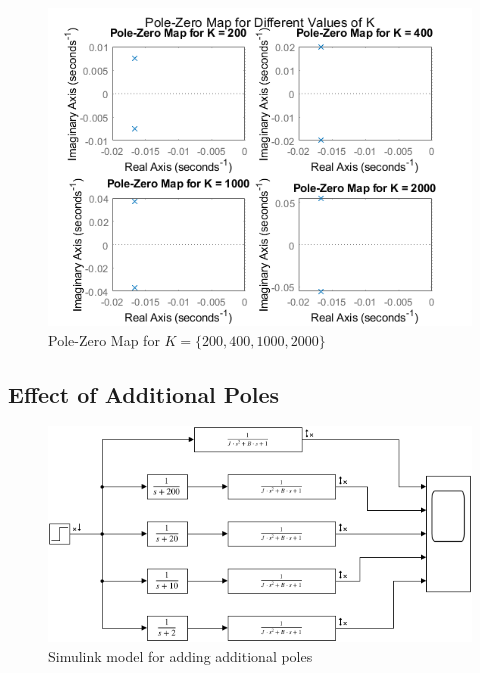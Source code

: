 \documentclass[a4paper, 12pt, english]{article}
\begin{document}
\begin{figure}[H]
    \centering
    \includegraphics[width=0.8\linewidth]{report/images/pzMap.png}
    \caption{Pole-Zero Map for $ {K} = {\{ 200, 400, 1000, 2000 \}} $}
    \label{fig:pole-zero map}
\end{figure}

\subsection{Effect of Additional Poles} \label{sec:effect of additional poles}

\begin{figure}[H]
    \centering
    \includegraphics[width=\linewidth]{report/images/poles_step_response_model.png}
    \caption{Simulink model for adding additional poles}
    \label{fig:Simulink additional poles}
\end{figure}
\end{document}

